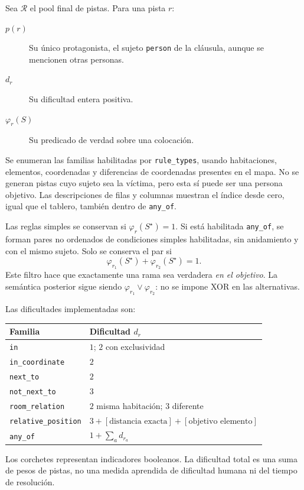 \documentclass[11pt,a4paper]{article}
\begin{document}
Sea $\mathcal R$ el pool final de pistas. Para una pista $r$:
\begin{description}
  \item[$p(r)$] Su \'unico protagonista, el sujeto \texttt{person} de
        la cl\'ausula, aunque se mencionen otras personas.
  \item[$d_r$] Su dificultad entera positiva.
  \item[$\varphi_r(S)$] Su predicado de verdad sobre una colocaci\'on.
\end{description}

Se enumeran las familias habilitadas por \texttt{rule\_types}, usando
habitaciones, elementos, coordenadas y diferencias de coordenadas
presentes en el mapa. No se generan pistas cuyo sujeto sea la
v\'ictima, pero esta s\'i puede ser una persona objetivo.
Las descripciones de filas y columnas muestran el \'indice desde
cero, igual que el tablero, tambi\'en dentro de \texttt{any\_of}.

Las reglas simples se conservan si $\varphi_r(S^\star)=1$.
Si est\'a habilitada \texttt{any\_of}, se forman pares no ordenados
de condiciones simples habilitadas, sin anidamiento y con el mismo
sujeto. Solo se conserva el par si
\[
 \varphi_{r_1}(S^\star)+\varphi_{r_2}(S^\star)=1.
\]
Este filtro hace que exactamente una rama sea verdadera
\emph{en el objetivo}. La sem\'antica posterior sigue siendo
$\varphi_{r_1}\lor\varphi_{r_2}$: no se impone XOR en las alternativas.

Las dificultades implementadas son:
\begin{center}
\begin{tabular}{ll}
\hline
Familia & Dificultad $d_r$\\
\hline
\texttt{in} & $1$; $2$ con exclusividad\\
\texttt{in\_coordinate} & $2$\\
\texttt{next\_to} & $2$\\
\texttt{not\_next\_to} & $3$\\
\texttt{room\_relation} & $2$ misma habitaci\'on; $3$ diferente\\
\texttt{relative\_position} &
 $3+[\text{distancia exacta}]+[\text{objetivo elemento}]$\\
\texttt{any\_of} & $1+\sum_a d_{r_a}$\\
\hline
\end{tabular}
\end{center}
Los corchetes representan indicadores booleanos. La dificultad total
es una suma de pesos de pistas, no una medida aprendida de dificultad
humana ni del tiempo de resoluci\'on.
\end{document}
